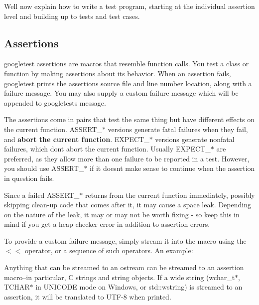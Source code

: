 We\textquotesingle{}ll now explain how to write a test program, starting at the individual assertion level and building up to tests and test cases.

\subsection*{Assertions}

googletest assertions are macros that resemble function calls. You test a class or function by making assertions about its behavior. When an assertion fails, googletest prints the assertion\textquotesingle{}s source file and line number location, along with a failure message. You may also supply a custom failure message which will be appended to googletest\textquotesingle{}s message.

The assertions come in pairs that test the same thing but have different effects on the current function. {\ttfamily A\+S\+S\+E\+R\+T\+\_\+$\ast$} versions generate fatal failures when they fail, and {\bfseries{abort the current function}}. {\ttfamily E\+X\+P\+E\+C\+T\+\_\+$\ast$} versions generate nonfatal failures, which don\textquotesingle{}t abort the current function. Usually {\ttfamily E\+X\+P\+E\+C\+T\+\_\+$\ast$} are preferred, as they allow more than one failure to be reported in a test. However, you should use {\ttfamily A\+S\+S\+E\+R\+T\+\_\+$\ast$} if it doesn\textquotesingle{}t make sense to continue when the assertion in question fails.

Since a failed {\ttfamily A\+S\+S\+E\+R\+T\+\_\+$\ast$} returns from the current function immediately, possibly skipping clean-\/up code that comes after it, it may cause a space leak. Depending on the nature of the leak, it may or may not be worth fixing -\/ so keep this in mind if you get a heap checker error in addition to assertion errors.

To provide a custom failure message, simply stream it into the macro using the {\ttfamily $<$$<$} operator, or a sequence of such operators. An example\+:


\begin{DoxyCode}{0}
\DoxyCodeLine{}
\DoxyCodeLine{\}}
\end{DoxyCode}


Anything that can be streamed to an {\ttfamily ostream} can be streamed to an assertion macro--in particular, C strings and {\ttfamily string} objects. If a wide string ({\ttfamily wchar\+\_\+t$\ast$}, {\ttfamily T\+C\+H\+A\+R$\ast$} in {\ttfamily U\+N\+I\+C\+O\+DE} mode on Windows, or {\ttfamily std\+::wstring}) is streamed to an assertion, it will be translated to U\+T\+F-\/8 when printed.

